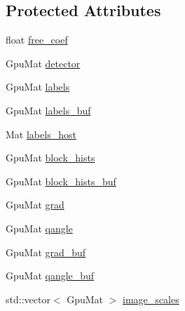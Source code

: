 \subsection*{Protected Attributes}
\begin{DoxyCompactItemize}
\item 
float \hyperlink{structcv_1_1gpu_1_1HOGDescriptor_a490a998c5bccba208ab0684fdcc1bc2d}{free\-\_\-coef}
\item 
Gpu\-Mat \hyperlink{structcv_1_1gpu_1_1HOGDescriptor_a4d765f28f1af6854eda44e3406a0b122}{detector}
\item 
Gpu\-Mat \hyperlink{structcv_1_1gpu_1_1HOGDescriptor_acc8f6714bb5dd8ecded2225d434b4478}{labels}
\item 
Gpu\-Mat \hyperlink{structcv_1_1gpu_1_1HOGDescriptor_aa09819a63d77f1a819842634d0f894b3}{labels\-\_\-buf}
\item 
Mat \hyperlink{structcv_1_1gpu_1_1HOGDescriptor_a83a636e0dddd8480f2eea8f81b9ebcc5}{labels\-\_\-host}
\item 
Gpu\-Mat \hyperlink{structcv_1_1gpu_1_1HOGDescriptor_adf0a7d4b8342032b47c5be7255d597ed}{block\-\_\-hists}
\item 
Gpu\-Mat \hyperlink{structcv_1_1gpu_1_1HOGDescriptor_a050f2faf673931e2a6cb1c704497880e}{block\-\_\-hists\-\_\-buf}
\item 
Gpu\-Mat \hyperlink{structcv_1_1gpu_1_1HOGDescriptor_aa9cedc881b28b3835a546954c29f6fcc}{grad}
\item 
Gpu\-Mat \hyperlink{structcv_1_1gpu_1_1HOGDescriptor_a706ce2936996876619084fac54e61464}{qangle}
\item 
Gpu\-Mat \hyperlink{structcv_1_1gpu_1_1HOGDescriptor_a4254ff83858134f269b9527843b7b354}{grad\-\_\-buf}
\item 
Gpu\-Mat \hyperlink{structcv_1_1gpu_1_1HOGDescriptor_a23ecc6bada4c3f54dfc4e9d67caaf5ad}{qangle\-\_\-buf}
\item 
std\-::vector$<$ Gpu\-Mat $>$ \hyperlink{structcv_1_1gpu_1_1HOGDescriptor_a2301efeb64505e3cbf63f6f3b5a01bf7}{image\-\_\-scales}
\end{DoxyCompactItemize}


